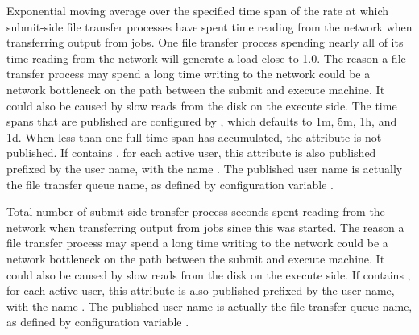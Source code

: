 \begin{description}
\item[\AdAttr{FileTransferNetReadLoad\_<timespan>}] Exponential moving
  average over the specified time span of the rate at which submit-side
  file transfer processes have spent time reading from the network
  when transferring output from jobs.  One file transfer process
  spending nearly all of its time reading from the network will
  generate a load close to 1.0.  The reason a file transfer process may
  spend a long time writing to the network could be a network
  bottleneck on the path between the submit and execute machine.  It
  could also be caused by slow reads from the disk on the execute side.
  The time spans that are published are configured by
  , which defaults to
  1m, 5m, 1h, and 1d.  When less than one full time span has
  accumulated, the attribute is not published.
  If  contains ,
  for each active user, this attribute is also published prefixed by
  the user name, with the name
  .
  The published user name is actually the file transfer queue name, as
  defined by configuration variable .

\item[\AdAttr{FileTransferNetReadSeconds}] Total number of submit-side
  transfer process seconds spent reading from the network when
  transferring output from jobs since this  was
  started.  The reason a file transfer process may
  spend a long time writing to the network could be a network
  bottleneck on the path between the submit and execute machine.  It
  could also be caused by slow reads from the disk on the execute side.
  If  contains ,
  for each active user, this attribute is also published prefixed by
  the user name, with the name
  .
  The published user name is actually the file transfer queue name, as
  defined by configuration variable .


\end{description}
